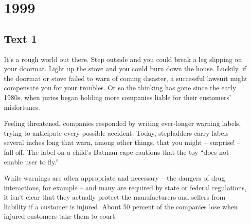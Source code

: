 
\section{1999}
\subsection{Text 1}
It’s a rough world out there. Step outside and you could break a leg slipping on your doormat. Light up the stove and you could burn down the house. Luckily, if the doormat or stove failed to warn of coming disaster, a successful lawsuit might compensate you for your troubles. Or so the thinking has gone since the early 1980s, when juries began holding more companies liable for their customers’ misfortunes.

Feeling threatened, companies responded by writing ever-longer warning labels, trying to anticipate every possible accident. Today, stepladders carry labels several inches long that warn, among other things, that you might -- surprise! -- fall off. The label on a child’s Batman cape cautions that the toy “does not enable user to fly.”

While warnings are often appropriate and necessary -- the dangers of drug interactions, for example -- and many are required by state or federal regulations, it isn’t clear that they actually protect the manufacturers and sellers from liability if a customer is injured. About 50 percent of the companies lose when injured customers take them to court.

